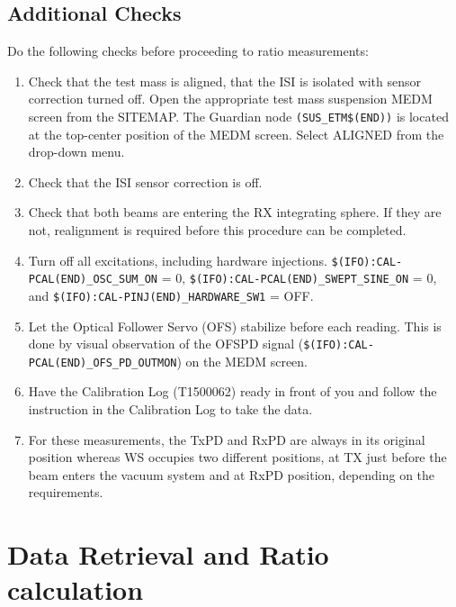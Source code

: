\subsection{Additional Checks}
Do the following checks before proceeding to ratio measurements:
\begin{enumerate}
\item Check that the test mass is aligned, that the ISI is isolated with sensor correction turned off.  Open the appropriate test mass suspension MEDM screen from the SITEMAP.  The Guardian node \verb|(SUS_ETM$(END))| is located at the top-center position of the MEDM screen.  Select ALIGNED from the drop-down menu.
\item Check that the ISI sensor correction is off.
\item Check that both beams are entering the RX integrating sphere. If they are not, realignment is required before this procedure can be completed.
\item Turn off all excitations, including hardware injections. \verb|$(IFO):CAL-PCAL(END)_OSC_SUM_ON| = 0, \verb|$(IFO):CAL-PCAL(END)_SWEPT_SINE_ON| = 0, and \verb|$(IFO):CAL-PINJ(END)_HARDWARE_SW1| = OFF.
\item Let the Optical Follower Servo (OFS) stabilize before each reading. This is done by visual observation of the OFSPD signal (\verb|$(IFO):CAL-PCAL(END)_OFS_PD_OUTMON|) on the MEDM screen. 
\item Have the Calibration Log (T1500062) ready in front of you and follow the instruction in the Calibration Log to take the data. 
\item For these measurements, the TxPD and RxPD are always in its original position whereas WS occupies two different positions, at TX just before the beam enters the vacuum system and at RxPD position, depending on the requirements.

\end{enumerate}

\section{Data Retrieval and Ratio calculation}
\label{sec:factors}
